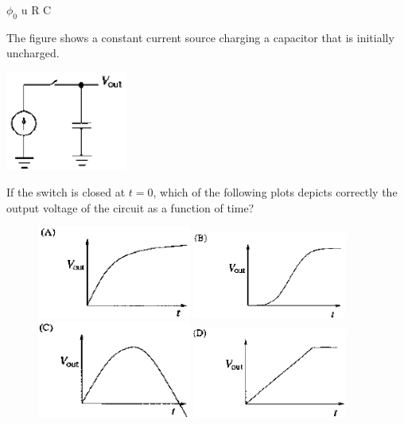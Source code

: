 \documentclass{exam}
\begin{document}
\begin{questions}
\begin{oneparchoices}
	\choice $\phi_0$ \choice u \choice R \choice C
\end{oneparchoices}

\question The figure shows a constant current source charging a capacitor that is initially uncharged.
	\begin{center}
		\includegraphics[width=0.3\textwidth]{pics/40.png}
	\end{center}
	If the switch is closed at $t=0$, which of the following plots depicts correctly the output voltage of the circuit as a function of time?\hfill{}
	\begin{figure}[H]
		\centering
		\includegraphics[width=0.45\textwidth]{pics/40a.png}
		\includegraphics[width=0.45\textwidth]{pics/40b.png}
		\includegraphics[width=0.45\textwidth]{pics/40c.png}
		\includegraphics[width=0.45\textwidth]{pics/40d.png}
	\end{figure}



\end{questions}
\end{document}
